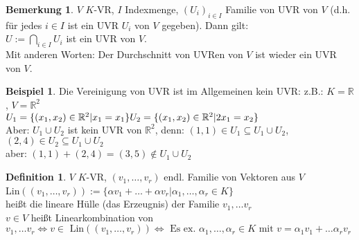 \documentclass[10pt,a4paper,numbers=endperiod]{scrartcl}
\theoremstyle{definition}
\newtheorem{defi}[satz]{Definition}
\newtheorem{bem}[satz]{Bemerkung}
\newtheorem{bsp}[satz]{Beispiel}
\def\RR{{\mathbb R}}
\begin{document}
\begin{bem}
	$V$ $K$-VR, $I$ Indexmenge, $(U_i)_{i \in I}$ Familie von UVR von $V$ (d.h. für jedes $i \in I$ ist ein UVR $U_i$ von $V$ gegeben). Dann gilt:\\
	$U:= \bigcap\limits_{i \in I} U_i$ ist ein UVR von $V$.\\
	Mit anderen Worten: Der Durchschnitt von UVRen von $V$ ist wieder ein UVR von $V$.
\end{bem}

\begin{bsp}
	Die Vereinigung von UVR ist im Allgemeinen kein UVR:
	z.B.: $K = \RR$, $V = \RR^2$\\
	$U_1 = \{(x_1,x_2) \in \RR^2 | x_1 = x_1\}\\
	U_2 = \{(x_1,x_2) \in \RR^2| 2x_1 = x_2\}$\\
	Aber: $U_1 \cup U_2$ ist kein UVR von $\RR^2$, denn: $(1,1) \in U_1 \subseteq U_1 \cup U_2$, $(2,4) \in U_2 \subseteq U_1 \cup U_2$\\
	aber: $(1,1) + (2,4) = (3,5) \notin U_1 \cup U_2$
\end{bsp}

\begin{defi}
	$V$ $K$-VR, $(v_1, \dots, v_r)$ endl. Familie von Vektoren aus $V$\\
	Lin$((v_1, \dots, v_r)) := \{\alpha v_1+ \dots +\alpha v_r| \alpha_1, \dots, \alpha_r \in K\}$\\
	heißt die lineare Hülle (das Erzeugnis) der Familie $v_1, \dots v_r$\\
	$v \in V$ heißt Linearkombination von $v_1, \dots v_r \Leftrightarrow v \in \text{ Lin}((v_1, \dots, v_r)) \Leftrightarrow \text{ Es ex. } \alpha_1, \dots, \alpha_r \in K \text{ mit } v= \alpha_1v_1+ \dots \alpha_rv_r$
\end{defi}
\end{document}
